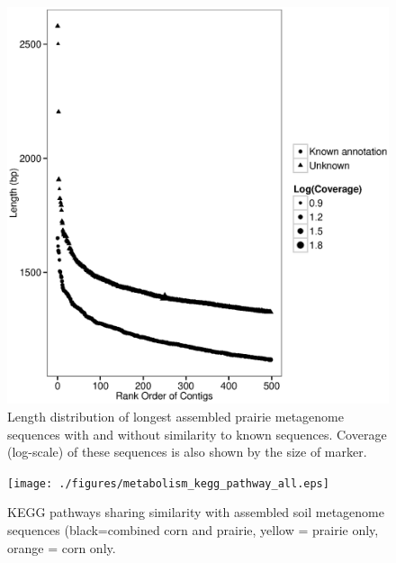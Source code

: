 \documentclass{pnastwo}
\begin{document}
\begin{figure}
\begin{center}
\centerline{\includegraphics[width=.7\textwidth]{./figures/prairie-cov-len-500.eps}}
\caption{Length distribution of longest assembled prairie metagenome sequences with and without similarity to known sequences.  Coverage (log-scale) of these sequences is also shown by the size of marker. }
\label{prairielength}
\end{center}
\end{figure}


\begin{figure}
\begin{center}
\centerline{\texttt{[image: ./figures/metabolism\_kegg\_pathway\_all.eps]}}
\caption{KEGG pathways sharing similarity with assembled soil metagenome sequences (black=combined corn and prairie, yellow = prairie only, orange = corn only.}
\label{kegg}
\end{center}
\end{figure}
\end{document}
